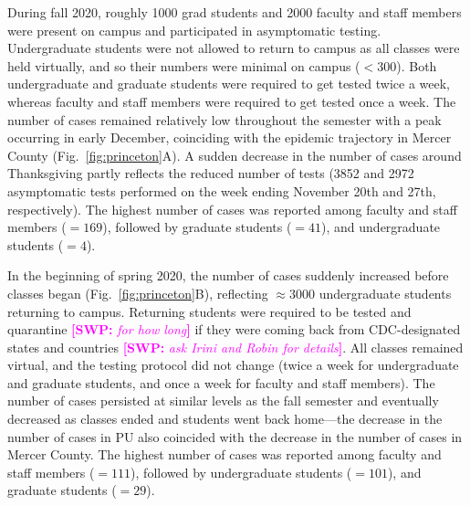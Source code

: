 \documentclass[12pt]{article}
\newcommand{\fref}[1]{Fig.~\ref{fig:#1}}
\newcommand{\comment}[3]{\textcolor{#1}{\textbf{[#2: }\textsl{#3}\textbf{]}}}
\newcommand{\swp}[1]{\comment{magenta}{SWP}{#1}}
\begin{document}
During fall 2020, roughly 1000 grad students and 2000 faculty and staff members were present on campus and participated in asymptomatic testing. 
Undergraduate students were not allowed to return to campus as all classes were held virtually, and so their numbers were minimal on campus ($<300$).  
Both undergraduate and graduate students were required to get tested twice a week, whereas faculty and staff members were required to get tested once a week.
The number of cases remained relatively low throughout the semester with a peak occurring in early December, coinciding with the epidemic trajectory in Mercer County (\fref{princeton}A).  
A sudden decrease in the number of cases around Thanksgiving partly reflects the reduced number of tests (3852 and 2972 asymptomatic tests performed on the week ending November 20th and 27th, respectively).
The highest number of cases was reported among faculty and staff members ($=169$), followed by graduate students ($=41$), and undergraduate students ($=4$).

In the beginning of spring 2020, the number of cases suddenly increased before classes began (\fref{princeton}B), reflecting $\approx 3000$ undergraduate students returning to campus.
Returning students were required to be tested and quarantine \swp{for how long} if they were coming back from CDC-designated states and countries \swp{ask Irini and Robin for details}.
All classes remained virtual, and the testing protocol did not change (twice a week for undergraduate and graduate students, and once a week for faculty and staff members).
The number of cases persisted at similar levels as the fall semester and eventually decreased as classes ended and students went back home---the decrease in the number of cases in PU also coincided with the decrease in the number of cases in Mercer County.
The highest number of cases was reported among faculty and staff members ($=111$), followed by undergraduate students ($=101$), and graduate students ($=29$).
\end{document}
